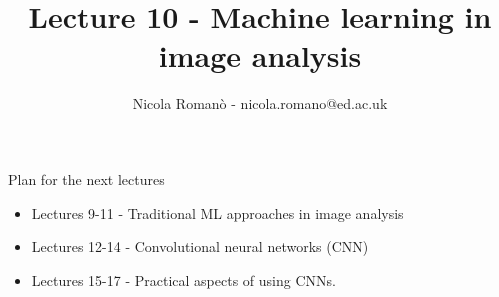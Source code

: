 \documentclass[9pt, aspectratio=169]{beamer}
\author{Nicola Roman\`o - nicola.romano@ed.ac.uk}
\title{Lecture 10 - Machine learning in image analysis}
\date{}
\begin{document}

\begin{frame}
    \titlepage
\end{frame}

\begin{frame}
    {Plan for the next lectures}
    \begin{itemize}
        \item Lectures 9-11 - Traditional ML approaches in image analysis
        \item Lectures 12-14 - Convolutional neural networks (CNN)
        \item Lectures 15-17 - Practical aspects of using CNNs.
    \end{itemize}
\end{frame}
\end{document}
